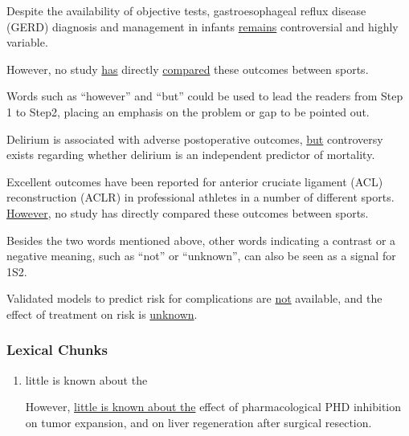 \documentclass[a4paper]{ctexbook}
\begin{document}
    \begin{eg}{}
      Despite the availability of objective tests, gastroesophageal reflux disease (GERD) diagnosis and management in infants \uline{remains} controversial and highly variable.
    \end{eg}

    \begin{eg}{}
      However, no study \uline{has} directly \uline{compared} these outcomes between sports.
    \end{eg}

    Words such as ``however'' and ``but'' could be used to lead the readers from Step 1 to Step2, placing an emphasis on the problem or gap to be pointed out.

    \begin{eg}{}
      Delirium is associated with adverse postoperative outcomes, \uline{but} controversy exists regarding whether delirium is an independent predictor of mortality.
    \end{eg}

    \begin{eg}{}
      Excellent outcomes have been reported for anterior cruciate ligament (ACL) reconstruction (ACLR) in professional athletes in a number of different sports. \uline{However}, no study has directly compared these outcomes between sports.
    \end{eg}

    Besides the two words mentioned above, other words indicating a contrast or a negative meaning, such as ``not'' or ``unknown'', can also be seen as a signal for 1S2.

    \begin{eg}{}
      Validated models to predict risk for complications are \uline{not} available, and the effect of treatment on risk is \uline{unknown}.
    \end{eg}

    \subsubsection{Lexical Chunks}

    \begin{enumerate}
      \item little is known about the
      \begin{eg}{}
        However, \uline{little is known about the} effect of pharmacological PHD inhibition on tumor expansion, and on liver regeneration after surgical resection.
      \end{eg}
    \end{enumerate}
\end{document}
